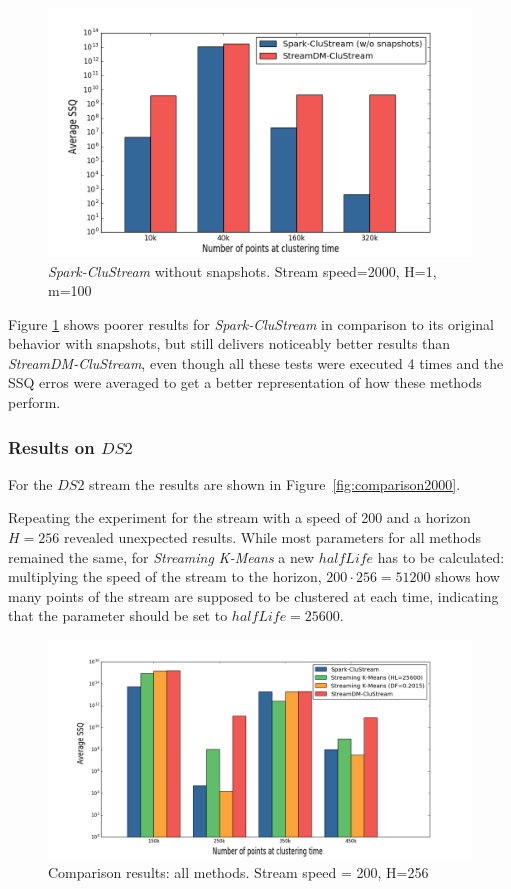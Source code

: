 \begin{figure}[h]
 \centering
 \includegraphics[scale=0.35]{./styles/comparisonNoSnaps.png}
 \caption{\textit{Spark-CluStream} without snapshots. Stream speed=2000, H=1, m=100}
 \label{fig:comparisonNoSnaps}
\end{figure}

Figure \ref{fig:comparisonNoSnaps} shows poorer results for \textit{Spark-CluStream} in comparison to its original behavior with snapshots, but still delivers noticeably better results than \textit{StreamDM-CluStream}, even though all these tests were executed 4 times and the SSQ erros were averaged to get a better representation of how these methods perform.

\subsubsection{Results on $DS2$}
For the $DS2$ stream the results are shown in Figure~\ref{fig:comparison2000}.

Repeating the experiment for the stream with a speed of 200 and a horizon $H=256$ revealed unexpected results. While most parameters for all methods remained the same, for \textit{Streaming K-Means} a new $halfLife$ has to be calculated: multiplying the speed of the stream to the horizon, $200\cdot 256=51200$ shows how many points of the stream are supposed to be clustered at each time, indicating that the parameter should be set to $halfLife=25600$. 

\begin{figure}[h!]
 \centering
 \includegraphics[scale=0.25]{./styles/comparison200.png}
 \caption{Comparison results: all methods. Stream speed = 200, H=256}
 \label{fig:comparison200}
\end{figure}

